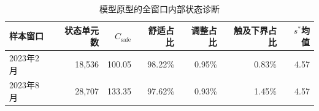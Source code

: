 \begin{table}[H]
\centering
\small
\caption{模型原型的全窗口内部状态诊断}
\label{tab:model-application}
\begin{tabular}{lrrrrrr}
\toprule
样本窗口 & 状态单元数 & $C_{\mathrm{safe}}$ & 舒适占比 & 调整占比 & 触及下界占比 & $s^*$均值 \\
\midrule
2023年2月 & 18,536 & 100.05 & 98.22\% & 0.95\% & 0.83\% & 4.57 \\
2023年8月 & 28,707 & 133.35 & 97.62\% & 0.93\% & 1.45\% & 4.57 \\
\bottomrule
\end{tabular}
\end{table}
